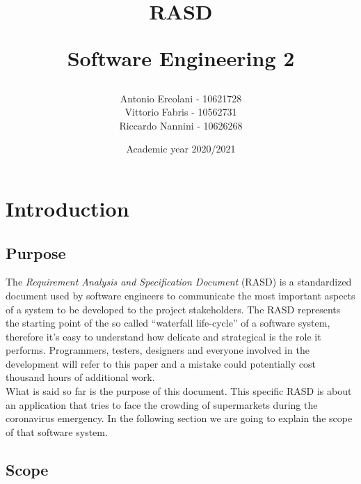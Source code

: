 \documentclass[]{article}
\title{ RASD \\
	\begin{large} 
		Software Engineering 2
	\end{large}}
\author{Antonio Ercolani - 10621728\\Vittorio Fabris - 10562731\\Riccardo Nannini - 10626268}
\date{Academic year 2020/2021}
\begin{document}
	
	\maketitle
	

	\newpage


	\tableofcontents
	
	\newpage
	
	
	\section{Introduction}
	
	\subsection{Purpose}
	
	The \textit{Requirement Analysis and Specification Document} (RASD) is a standardized document used by software engineers to communicate the most important aspects of a system to be developed to the project stakeholders. The RASD represents the starting point of the so called “waterfall life-cycle” of a software system, therefore it’s easy to understand how delicate and strategical is the role it performs. Programmers, testers, designers and everyone involved in the development will refer to this paper and a mistake could potentially cost thousand hours of additional work. 
	\smallskip
	\\
	What is said so far is the purpose of this document. This specific RASD is about an application that tries to face the crowding of supermarkets during the coronavirus emergency. In the following section we are going to explain the scope of that software system.

	\subsection{Scope}
	
		
				
\end{document}
